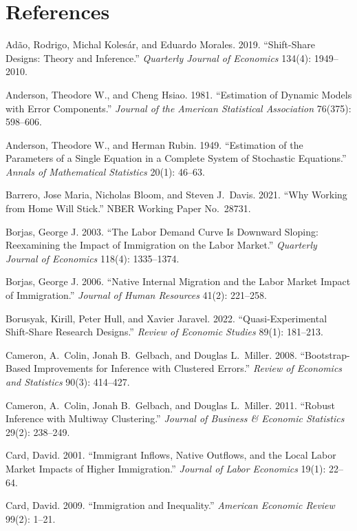 \documentclass[11pt]{article}
\begin{document}
\section*{References}
\small
\begin{list}{}{%
  \setlength{\leftmargin}{1.5em}%
  \setlength{\itemindent}{-1.5em}%
  \setlength{\itemsep}{0.14em}%
  \setlength{\parsep}{0pt}%
}
\item Ad\~{a}o, Rodrigo, Michal Koles\'{a}r, and Eduardo Morales. 2019. ``Shift-Share Designs: Theory and Inference.'' \emph{Quarterly Journal of Economics} 134(4): 1949--2010.
\item Anderson, Theodore W., and Cheng Hsiao. 1981. ``Estimation of Dynamic Models with Error Components.'' \emph{Journal of the American Statistical Association} 76(375): 598--606.
\item Anderson, Theodore W., and Herman Rubin. 1949. ``Estimation of the Parameters of a Single Equation in a Complete System of Stochastic Equations.'' \emph{Annals of Mathematical Statistics} 20(1): 46--63.
\item Barrero, Jose Maria, Nicholas Bloom, and Steven J.\ Davis. 2021. ``Why Working from Home Will Stick.'' NBER Working Paper No.\ 28731.
\item Borjas, George J. 2003. ``The Labor Demand Curve Is Downward Sloping: Reexamining the Impact of Immigration on the Labor Market.'' \emph{Quarterly Journal of Economics} 118(4): 1335--1374.
\item Borjas, George J. 2006. ``Native Internal Migration and the Labor Market Impact of Immigration.'' \emph{Journal of Human Resources} 41(2): 221--258.
\item Borusyak, Kirill, Peter Hull, and Xavier Jaravel. 2022. ``Quasi-Experimental Shift-Share Research Designs.'' \emph{Review of Economic Studies} 89(1): 181--213.
\item Cameron, A.\ Colin, Jonah B.\ Gelbach, and Douglas L.\ Miller. 2008. ``Bootstrap-Based Improvements for Inference with Clustered Errors.'' \emph{Review of Economics and Statistics} 90(3): 414--427.
\item Cameron, A.\ Colin, Jonah B.\ Gelbach, and Douglas L.\ Miller. 2011. ``Robust Inference with Multiway Clustering.'' \emph{Journal of Business \& Economic Statistics} 29(2): 238--249.
\item Card, David. 2001. ``Immigrant Inflows, Native Outflows, and the Local Labor Market Impacts of Higher Immigration.'' \emph{Journal of Labor Economics} 19(1): 22--64.
\item Card, David. 2009. ``Immigration and Inequality.'' \emph{American Economic Review} 99(2): 1--21.

\end{list}
\end{document}
